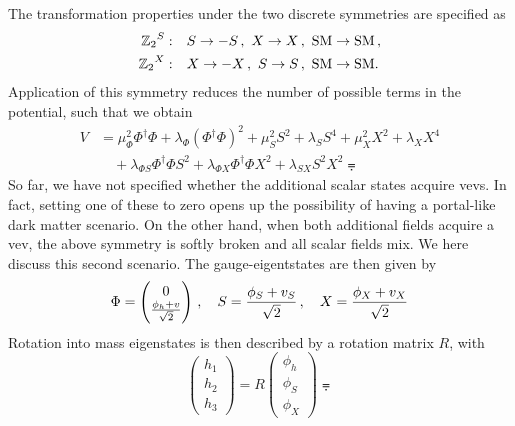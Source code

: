 The transformation properties under the two discrete symmetries are specified as
\begin{equation}
    \begin{aligned}
        {\mathbb{Z}_2}^S:\quad & S\to -S\,,\ X\to X\,,\ \text{SM} \to \text{SM}\,, \\
        {\mathbb{Z}_2}^X:\quad & X\to -X\,,\ S \to S\,,\ \text{SM} \to \text{SM}.
    \end{aligned}\label{eq:Z2syms}
\end{equation}
Application of this symmetry reduces the number of possible terms in the potential, such that we obtain 
\begin{equation}
    \begin{aligned}
        V & = \mu_{\Phi}^2 \Phi^\dagger \Phi + \lambda_{\Phi} {(\Phi^\dagger\Phi)}^2
        + \mu_{S}^2 S^2 + \lambda_S S^4
        + \mu_{X}^2 X^2 + \lambda_X X^4                                              \\
          & \quad+ \lambda_{\Phi S} \Phi^\dagger \Phi S^2
        + \lambda_{\Phi X} \Phi^\dagger \Phi X^2
        + \lambda_{SX} S^2 X^2\eqdot
    \end{aligned}\label{eq:TRSMpot}
\end{equation}
So far, we have not specified whether the additional scalar states acquire vevs. In fact, setting one of these to zero opens up the possibility of having a portal-like dark matter scenario. On the other hand, when both additional fields acquire a vev, the above symmetry is softly broken and all scalar fields mix. We here discuss this second scenario. The gauge-eigentstates are then given by
\begin{equation}
    \Phi = \begin{pmatrix} 0\\\frac{\phi_h + v}{\sqrt{2}}\end{pmatrix}\,,\quad
    S = \frac{\phi_S + v_S}{\sqrt{2}}\,, \quad
    X = \frac{\phi_X + v_X}{\sqrt{2}}
    \label{eq:fields}
\end{equation}
Rotation into mass eigenstates is then described by a rotation matrix $R$, with
\begin{equation}
    \begin{pmatrix}
        h_1 \\h_2\\h_3
    \end{pmatrix} = R \begin{pmatrix}
        \phi_h \\\phi_S\\\phi_X
    \end{pmatrix}\eqdot
\end{equation}
